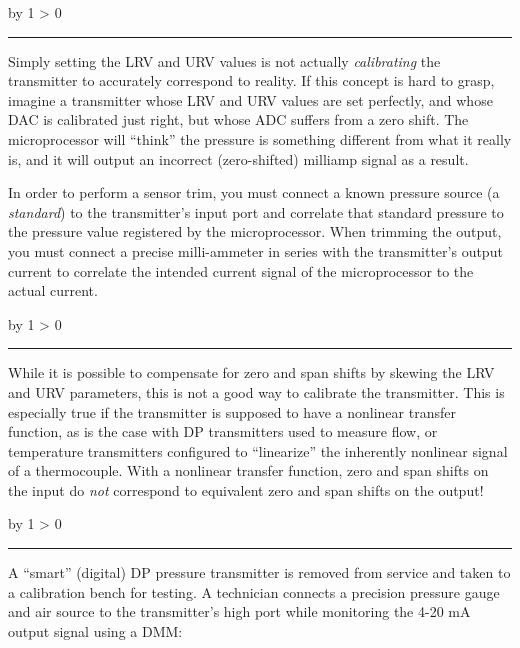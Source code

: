 \documentclass[12pt,a4paper]{article}
\def\oppgave{
            \advance\questnum by 1
            \ifnum \questnum > 0
                 \hrule
                 \vskip 3pt
                 \leftline{Oppgave \the\questnum}
                 \vskip 3pt \fi}
\def\svar{
           \advance\answnum by 1
           \ifnum \answnum > 0
                \hrule
                \vskip 3pt
                \leftline{Svar \the\answnum}
                \vskip 3pt \fi}
\def\notes{
           \advance\explnum by 1
           \ifnum \explnum > 0
                \hrule
                \vskip 3pt
                \leftline{Notes \the\explnum}
                \vskip 3pt \fi}
\begin{document}
\vskip 10pt \filbreak 





\svar{} 

Simply setting the LRV and URV values is not actually {\it calibrating} the transmitter to accurately correspond to reality.  If this concept is hard to grasp, imagine a transmitter whose LRV and URV values are set perfectly, and whose DAC is calibrated just right, but whose ADC suffers from a zero shift.  The microprocessor will ``think'' the pressure is something different from what it really is, and it will output an incorrect (zero-shifted) milliamp signal as a result.

\vskip 10pt

In order to perform a sensor trim, you must connect a known pressure source (a {\it standard}) to the transmitter's input port and correlate that standard pressure to the pressure value registered by the microprocessor.  When trimming the output, you must connect a precise milli-ammeter in series with the transmitter's output current to correlate the intended current signal of the microprocessor to the actual current.

\vskip 10pt \filbreak 





\notes{} 

While it is possible to compensate for zero and span shifts by skewing the LRV and URV parameters, this is not a good way to calibrate the transmitter.  This is especially true if the transmitter is supposed to have a nonlinear transfer function, as is the case with DP transmitters used to measure flow, or temperature transmitters configured to ``linearize'' the inherently nonlinear signal of a thermocouple.  With a nonlinear transfer function, zero and span shifts on the input do {\it not} correspond to equivalent zero and span shifts on the output!


\vfil \eject 



\oppgave{} 

A ``smart'' (digital) DP pressure transmitter is removed from service and taken to a calibration bench for testing.  A technician connects a precision pressure gauge and air source to the transmitter's high port while monitoring the 4-20 mA output signal using a DMM:
\end{document}
